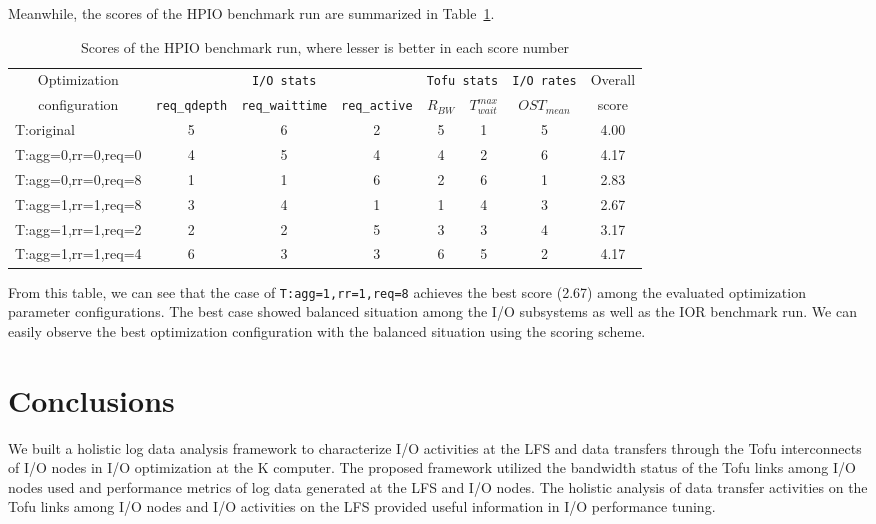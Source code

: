 \documentclass{jhps}
\begin{document}
Meanwhile, the scores of the HPIO benchmark run are summarized in
Table~\ref{tbl:HPIO_OVERALL_EVAL}.
%
\begin{table}[tb]
\caption{Scores of the HPIO benchmark run, where lesser is better in each score number}
\centering
\begin{tabular}{lccccccc}
\hline
\multicolumn{1}{c}{Optimization}  & \multicolumn{3}{c}{{\tt I/O stats}} & \multicolumn{2}{c}{{\tt Tofu stats}} & {\tt I/O rates} & Overall \\
\multicolumn{1}{c}{configuration} & {\tt req\_qdepth} & {\tt req\_waittime} & {\tt req\_active} &  $R_{BW}$ & $T_{wait}^{max}$ & $OST_{mean}$ & score \\
\hline
T:original         & 5 & 6 & 2 & 5 & 1 & 5 & 4.00 \\
T:agg=0,rr=0,req=0 & 4 & 5 & 4 & 4 & 2 & 6 & 4.17 \\
T:agg=0,rr=0,req=8 & 1 & 1 & 6 & 2 & 6 & 1 & 2.83 \\
T:agg=1,rr=1,req=8 & 3 & 4 & 1 & 1 & 4 & 3 & 2.67 \\
T:agg=1,rr=1,req=2 & 2 & 2 & 5 & 3 & 3 & 4 & 3.17 \\
T:agg=1,rr=1,req=4 & 6 & 3 & 3 & 6 & 5 & 2 & 4.17 \\
\hline
\end{tabular}
\label{tbl:HPIO_OVERALL_EVAL}
\end{table}
%
From this table, we can see that the case of {\tt T:agg=1,rr=1,req=8}
achieves the best score (2.67) among the evaluated optimization parameter configurations.
The best case showed balanced situation among the I/O subsystems
as well as the IOR benchmark run.
We can easily observe the best optimization configuration with
the balanced situation using the scoring scheme.

\section{Conclusions}
\label{sec:CONCLUSIONS}

We built a holistic log data analysis framework to characterize I/O activities
at the LFS and data transfers through the Tofu interconnects of I/O nodes
in I/O optimization at the K computer.
The proposed framework utilized the bandwidth status of the Tofu links
among I/O nodes used and performance metrics of log data generated at the LFS
and I/O nodes.
The holistic analysis of data transfer activities on the Tofu links among I/O nodes
and I/O activities on the LFS provided useful information in I/O performance tuning.
\end{document}
